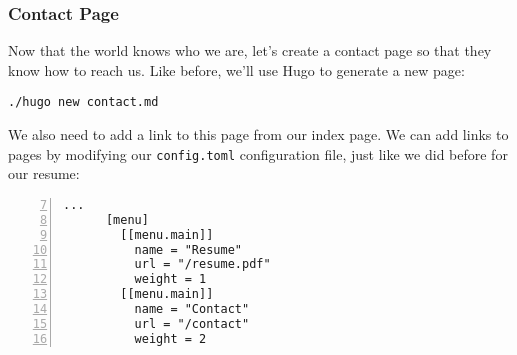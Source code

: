 \begin{frame}[fragile]
    \frametitle{Contact Page}

    Now that the world knows who we are, let's create a contact page so that they know how to reach us.
    Like before, we'll use Hugo to generate a new page:

    \medskip

    \begin{lstlisting}[style=saneCode,gobble=6]
      ./hugo new contact.md
    \end{lstlisting}

    \vfill

    We also need to add a link to this page from our index page. We can add links to pages by modifying our 
    \texttt{config.toml} configuration file, just like we did before for our resume:

    \begin{lstlisting}[style=saneCode,gobble=6,title={config.toml},numbers=left,firstnumber=7]
      ...
      [menu]
        [[menu.main]]
          name = "Resume"
          url = "/resume.pdf"
          weight = 1
        [[menu.main]]
          name = "Contact"
          url = "/contact"
          weight = 2
    \end{lstlisting}
\end{frame}